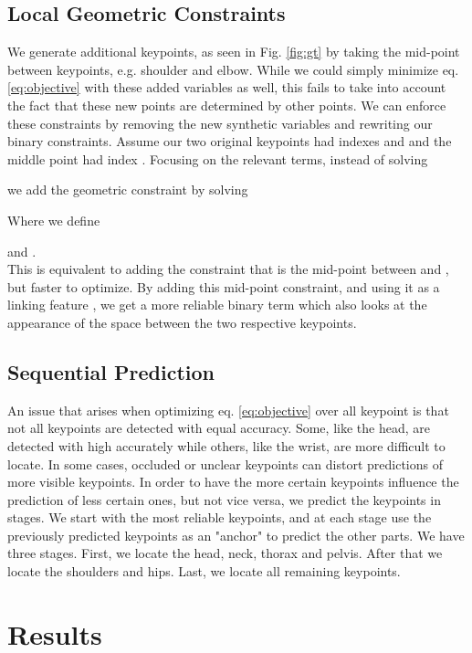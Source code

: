 \documentclass{article}
\begin{document}
\subsection{Local Geometric Constraints}
We generate additional keypoints, as seen in Fig. \ref{fig:gt} by taking the mid-point between keypoints, e.g. shoulder and elbow. While we could simply minimize eq. \ref{eq:objective} with these added variables as well, this fails to take into account  the fact that these new points are determined by other points. We can enforce these constraints by removing the new synthetic variables and rewriting our binary constraints. Assume our two original keypoints had indexes  and  and the middle point had index . Focusing on the relevant terms, instead of solving 


we  add the geometric constraint by solving



Where we define 

and . \\

This is equivalent to adding the constraint that  is the  mid-point between  and , but faster to optimize. By adding this mid-point constraint, and using it as a linking feature \cite{karlinsky12}, we get a more reliable binary term which also looks at the appearance of the space between the two respective keypoints. 


\subsection{Sequential Prediction} \label{sec:seq}
An issue that arises when optimizing eq. \ref{eq:objective} over all keypoint is that not all keypoints are detected with equal accuracy. Some, like the head, are detected with high accurately while others, like the wrist, are more difficult to locate. In some cases, occluded or unclear keypoints can distort predictions of more visible keypoints. In order to have the more certain keypoints influence the prediction of less certain ones, but not vice versa, we predict the keypoints in stages. 
We start with the most reliable keypoints, and at each stage use the previously predicted keypoints as an "anchor" to predict the other parts. We have three stages. First, we locate the head, neck, thorax and pelvis. After that we locate the shoulders and hips. Last, we locate all remaining keypoints.

\section{Results}\label{sec:res}
\end{document}

